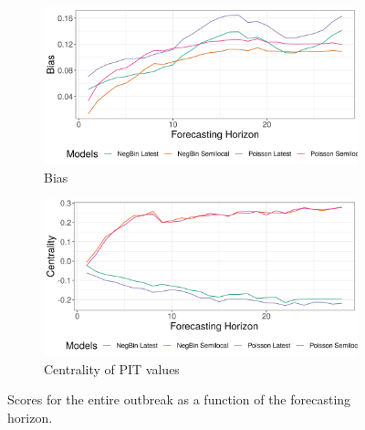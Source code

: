 \begin{figure}[H]
\begin{subfigure}{0.5\textwidth}
  \centering
  \includegraphics[width=\linewidth]{../output/Katwa_bias.png}  
  \caption{Bias}
  \label{fig:sub-third}
\end{subfigure}
\begin{subfigure}{0.5\textwidth}
  \centering
  \includegraphics[width=\linewidth]{../output/Katwa_centrality.png}  
  \caption{Centrality of PIT values}
  \label{fig:nat_scores_4}
\end{subfigure}
  \caption{Scores for the entire outbreak as a function of the forecasting horizon.}

  \label{fig:nat_scores}
\end{figure}
